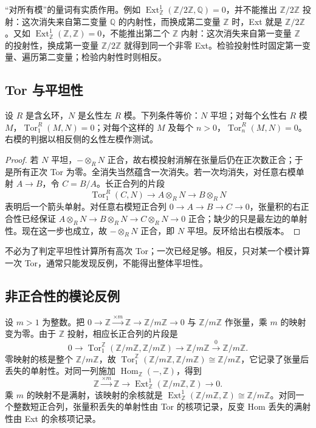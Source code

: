 “对所有模”的量词有实质作用。例如 \(\operatorname{Ext}_{\mathbb Z}^1(\mathbb Z/2\mathbb Z,\mathbb Q)=0\)，并不能推出 \(\mathbb Z/2\mathbb Z\) 投射：这次消失来自第二变量 \(\mathbb Q\) 的内射性，而换成第二变量 \(\mathbb Z\) 时，Ext 就是 \(\mathbb Z/2\mathbb Z\)。又如 \(\operatorname{Ext}_{\mathbb Z}^1(\mathbb Z,\mathbb Z)=0\)，不能推出第二个 \(\mathbb Z\) 内射：这次消失来自第一变量 \(\mathbb Z\) 的投射性，换成第一变量 \(\mathbb Z/2\mathbb Z\) 就得到同一个非零 Ext。检验投射性时固定第一变量、遍历第二变量；检验内射性时则相反。

\subsection{Tor 与平坦性}
\label{b4:subsec:0804:02}

\begin{theorem}\label{b4:thm:tor-flat-criterion}
	设 \(R\) 是含幺环，\(N\) 是幺性左 \(R\) 模。下列条件等价：\(N\) 平坦；对每个幺性右 \(R\) 模 \(M\)，\(\operatorname{Tor}_1^R(M,N)=0\)；对每个这样的 \(M\) 及每个 \(n>0\)，\(\operatorname{Tor}_n^R(M,N)=0\)。右模的判据以相反侧的幺性左模作测试。
\end{theorem}
\begin{proof}
	若 \(N\) 平坦，\(-\otimes_RN\) 正合，故右模投射消解在张量后仍在正次数正合；于是所有正次 Tor 为零。全消失当然蕴含一次消失。若一次均消失，对任意右模单射 \(A\to B\)，令 \(C=B/A\)。长正合列的片段
	\[
		\operatorname{Tor}_1^R(C,N)\longrightarrow A\otimes_RN \longrightarrow B\otimes_RN
	\]
	表明后一个箭头单射。对任意右模短正合列 \(0\to A\to B\to C\to0\)，张量积的右正合性已经保证 \(A\otimes_RN\to B\otimes_RN\to C\otimes_RN\to0\) 正合；缺少的只是最左边的单射性。现在这一步也成立，故 \(-\otimes_RN\) 正合，即 \(N\) 平坦。反环给出右模版本。
\end{proof}

不必为了判定平坦性计算所有高次 Tor；一次已经足够。相反，只对某一个模计算一次 Tor，通常只能发现反例，不能得出整体平坦性。

\subsection{非正合性的模论反例}
\label{b4:subsec:0804:03}

设 \(m>1\) 为整数。把 \(0\to\mathbb Z\xrightarrow{\times m}\mathbb Z\to\mathbb Z/m\mathbb Z\to0\) 与 \(\mathbb Z/m\mathbb Z\) 作张量，乘 \(m\) 的映射变为零。由于 \(\mathbb Z\) 投射，相应长正合列的片段是
\[
	0\longrightarrow\operatorname{Tor}_1^{\mathbb Z}(\mathbb Z/m\mathbb Z,\mathbb Z/m\mathbb Z) \longrightarrow\mathbb Z/m\mathbb Z\xrightarrow{0}\mathbb Z/m\mathbb Z.
\]
零映射的核是整个 \(\mathbb Z/m\mathbb Z\)，故 \(\operatorname{Tor}_1^{\mathbb Z}(\mathbb Z/m\mathbb Z,\mathbb Z/m\mathbb Z)\cong\mathbb Z/m\mathbb Z\)，它记录了张量后丢失的单射性。对同一列施加 \(\operatorname{Hom}_{\mathbb Z}(-,\mathbb Z)\)，得到
\[
	\mathbb Z\xrightarrow{\times m}\mathbb Z \longrightarrow\operatorname{Ext}_{\mathbb Z}^1(\mathbb Z/m\mathbb Z,\mathbb Z) \longrightarrow0.
\]
乘 \(m\) 的映射不是满射，该映射的余核就是 \(\operatorname{Ext}_{\mathbb Z}^1(\mathbb Z/m\mathbb Z,\mathbb Z)\cong\mathbb Z/m\mathbb Z\)。对同一个整数短正合列，张量积丢失的单射性由 Tor 的核项记录，反变 Hom 丢失的满射性由 Ext 的余核项记录。

